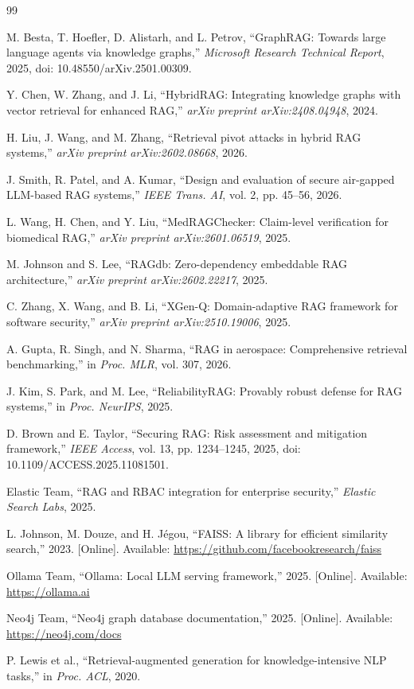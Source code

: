 \documentclass[journal,12pt,twocolumn]{IEEEtran}
\begin{document}
\begin{thebibliography}{99}

M. Besta, T. Hoefler, D. Alistarh, and L. Petrov, ``GraphRAG: Towards large language agents via knowledge graphs,'' \textit{Microsoft Research Technical Report}, 2025, doi: 10.48550/arXiv.2501.00309.

Y. Chen, W. Zhang, and J. Li, ``HybridRAG: Integrating knowledge graphs with vector retrieval for enhanced RAG,'' \textit{arXiv preprint arXiv:2408.04948}, 2024.

H. Liu, J. Wang, and M. Zhang, ``Retrieval pivot attacks in hybrid RAG systems,'' \textit{arXiv preprint arXiv:2602.08668}, 2026.

J. Smith, R. Patel, and A. Kumar, ``Design and evaluation of secure air-gapped LLM-based RAG systems,'' \textit{IEEE Trans. AI}, vol. 2, pp. 45--56, 2026.

L. Wang, H. Chen, and Y. Liu, ``MedRAGChecker: Claim-level verification for biomedical RAG,'' \textit{arXiv preprint arXiv:2601.06519}, 2025.

M. Johnson and S. Lee, ``RAGdb: Zero-dependency embeddable RAG architecture,'' \textit{arXiv preprint arXiv:2602.22217}, 2025.

C. Zhang, X. Wang, and B. Li, ``XGen-Q: Domain-adaptive RAG framework for software security,'' \textit{arXiv preprint arXiv:2510.19006}, 2025.

A. Gupta, R. Singh, and N. Sharma, ``RAG in aerospace: Comprehensive retrieval benchmarking,'' in \textit{Proc. MLR}, vol. 307, 2026.

J. Kim, S. Park, and M. Lee, ``ReliabilityRAG: Provably robust defense for RAG systems,'' in \textit{Proc. NeurIPS}, 2025.

D. Brown and E. Taylor, ``Securing RAG: Risk assessment and mitigation framework,'' \textit{IEEE Access}, vol. 13, pp. 1234--1245, 2025, doi: 10.1109/ACCESS.2025.11081501.

Elastic Team, ``RAG and RBAC integration for enterprise security,'' \textit{Elastic Search Labs}, 2025.

L. Johnson, M. Douze, and H. Jégou, ``FAISS: A library for efficient similarity search,'' 2023. [Online]. Available: \url{https://github.com/facebookresearch/faiss}

Ollama Team, ``Ollama: Local LLM serving framework,'' 2025. [Online]. Available: \url{https://ollama.ai}

Neo4j Team, ``Neo4j graph database documentation,'' 2025. [Online]. Available: \url{https://neo4j.com/docs}

P. Lewis et al., ``Retrieval-augmented generation for knowledge-intensive NLP tasks,'' in \textit{Proc. ACL}, 2020.

\end{thebibliography}
\end{document}
